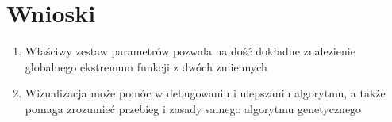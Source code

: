 \documentclass[a4paper, 12pt]{article}
\begin{document}
\section{Wnioski} 
\begin{enumerate}
    \item Właściwy zestaw parametrów pozwala na dość dokładne znalezienie globalnego ekstremum funkcji z dwóch zmiennych
    \item Wizualizacja może pomóc w debugowaniu i ulepszaniu algorytmu, a także pomaga zrozumieć przebieg i zasady samego algorytmu genetycznego
\end{enumerate}

\label{LastPage}~
\label{LastPageOfBackMatter}~		
\end{document}

